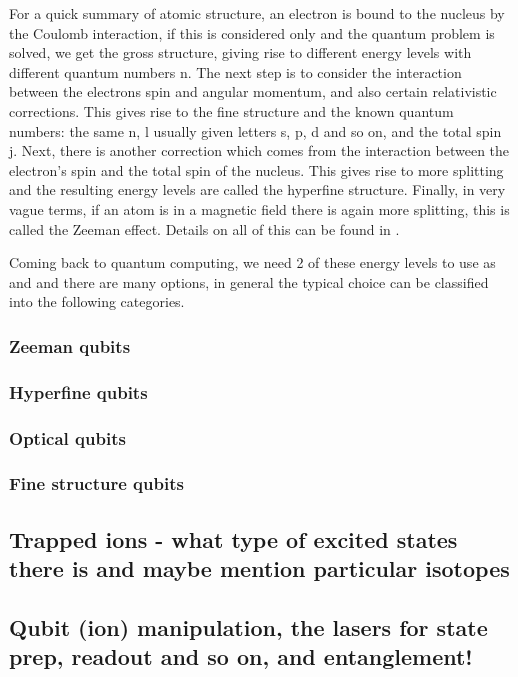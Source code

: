 For a quick summary of atomic structure, an electron is bound to the nucleus by the Coulomb interaction, if this is considered only and the quantum problem is solved, we get the gross structure, giving rise to different energy levels with different quantum numbers n.
The next step is to consider the interaction between the electrons spin and angular momentum, and also certain relativistic corrections.
This gives rise to the fine structure and the known quantum numbers: the same n, l usually given letters s, p, d and so on, and the total spin j.
Next, there is another correction which comes from the interaction between the electron's spin and the total spin of the nucleus.
This gives rise to more splitting and the resulting energy levels are called the hyperfine structure.
Finally, in very vague terms, if an atom is in a magnetic field there is again more splitting, this is called the Zeeman effect.
Details on all of this can be found in \cite{woodgateELEMENTARYATOMICSTRUCTURE1970}.

Coming back to quantum computing, we need 2 of these energy levels to use as \kz and \ko and there are many options, in general the typical choice can be classified into the following categories.
\subsubsection{Zeeman qubits}
\subsubsection{Hyperfine qubits}
\subsubsection{Optical qubits}
\subsubsection{Fine structure qubits}




\subsection{Trapped ions - what type of excited states there is and maybe mention particular isotopes}


\subsection{Qubit (ion) manipulation, the lasers for state prep, readout and so on, and entanglement!}

